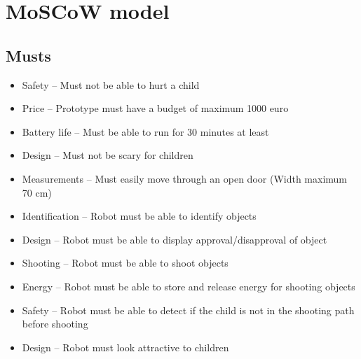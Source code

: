 \documentclass[11pt,twoside,a4paper]{report}
\begin{document}
\begin{appendices}
\begin{usecase}
\end{usecase}

\begin{usecase}
\end{usecase}
\label{appendix:usecase}

\chapter{MoSCoW model}
\label{appendix:moscow}
\section*{Musts}
\begin{itemize}
\item Safety --         Must not be able to hurt a child
\item Price --             Prototype must have a budget of maximum 1000 euro
\item Battery life --         Must be able to run for 30 minutes at least
\item Design --        Must not be scary for children
\item Measurements --     Must easily move through an open door (Width maximum 70 cm)
\item Identification --        Robot must be able to identify objects
\item Design --       Robot must be able to display approval/disapproval of object
\item Shooting --        Robot must be able to shoot objects
\item Energy --         Robot must be able to store and release energy for shooting objects
\item Safety --        Robot must be able to detect if the child is not in the shooting path before shooting
\item Design --         Robot must look attractive to children
\end{itemize}

\end{appendices}
\end{document}

